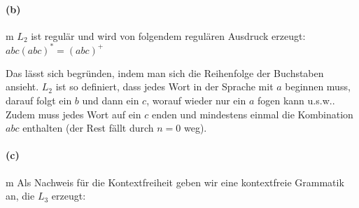 \paragraph{(b)}m
	$L_2$ ist regulär und wird von folgendem regulären Ausdruck erzeugt: $abc(abc)^* = (abc)^+$

	Das lässt sich begründen, indem man sich die Reihenfolge der Buchstaben ansieht. $L_2$ ist so definiert, dass jedes Wort in der Sprache mit $a$ beginnen muss, darauf folgt ein $b$ und dann ein $c$, worauf wieder nur ein $a$ fogen kann u.s.w.. Zudem muss jedes Wort auf ein $c$ enden und mindestens einmal die Kombination $abc$ enthalten (der Rest fällt durch $n=0$ weg).
	
	

	\vspace{0.3cm}

\paragraph{(c)}m
	Als Nachweis für die Kontextfreiheit geben wir eine kontextfreie Grammatik an, die $L_3$ erzeugt:
	
